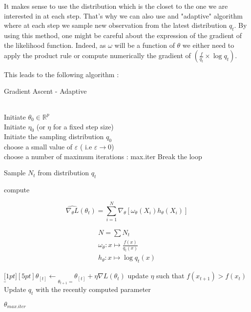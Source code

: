 It makes sense to use the distribution which is the closet to the one we are interested in at each step. That's why we can also use and "adaptive" algorithm where at each step we sample new observation from the latest distribution $q_t$. By using this method, one might be careful about the expression of the gradient of the likelihood function. Indeed, as $\omega$ will be a function of $\theta$ we either need to apply the product rule or compute numerically the gradient of $(\frac {f}{q_t} \times \log q_t)$.

This leads to the following algorithm :


\begin{algorithm}[H]
    \caption{Gradient Ascent - Adaptive}\label{alg:gaAdaptive}
    \begin{algorithmic}
        \Require 
        \\ \ra Initiate $\theta_0 \in \mathbb R^p$ 
        \\ \ra Initiate $\eta_0$ (or $\eta$ for a fixed step size) 
        \\ \ra Initiate the sampling distribution $q_0$
        \\ \ra choose a small value of $\varepsilon$ ( i.e $\varepsilon \rightarrow 0 $)
        \\ \ra choose a number of maximum iterations : max.iter
        \State Break the loop
        \EndIf

            \smallskip

            \State \ra Sample $N_t$ from distribution $q_t$ 
            
            \bigskip
            
            \State \ra compute 
            
            $$\widehat{\nabla_\theta L}(\theta_t) = \displaystyle\sum\limits_{i=1}^{N} \nabla_\theta \left[\omega_\theta(X_i) h_\theta(X_i)\right]$$ 
            

            $$\begin{array}{l}
                {N = \sum N_t}
                \\
                {\omega_\theta : x \mapsto \frac{f(x)}{q_t(x)}}
                \\
                {h_\theta : x \mapsto \log q_t(x)}
            \end{array}$$
            
            \bigskip

            \State \ra $\underbracket[1pt][5pt]{\theta_{[t]} \gets}_{\theta_{t+1} = } \theta_{[t]} + \eta \nabla L(\theta_t)$
            \State \ra update $\eta$ such that $f(x_{t+1}) > f(x_t)$ 
            \State \ra Update $q_t$ with the recently computed parameter
        \EndFor  
    
    \Return $\theta_{max.iter}$
    \end{algorithmic}
    \end{algorithm}